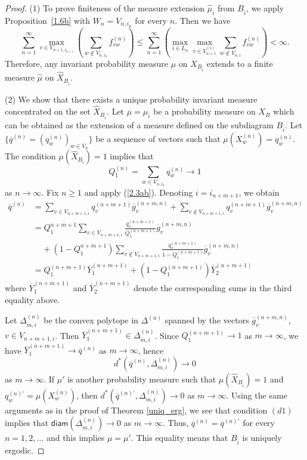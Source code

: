 \documentclass[11pt, english, reqno]{amsart}
\theoremstyle{definition}
\theoremstyle{remark}
\theoremstyle{plain}
\def\ov{\overline}
\def\wh{\widehat}
\numberwithin{equation}{section}
\begin{document}
{\begin{proof}
(1) To prove finiteness of the measure extension $\wh\mu_i$
from $B_{\ov i}$, we apply Proposition~\ref{1.6b} with $W_n = V_{n,i_n}$
 for every $n$. Then we  have
$$
\sum_{n=1}^{\infty} \max_{v \in V_{n+1, i_{n+1}}} \left( \sum_{w \notin
 V_{n,i_n}}f_{vw}^{(n)}\right) \leq \sum_{n = 1}^{\infty} \left(\max_{i \in
  L_{n}} \max_{v \in V_{n+1}^{(i)}}
 \sum_{w \notin V_{n,i}} f_{vw}^{(n)}\right) < \infty.
$$
Therefore, any invariant probability measure $\mu$ on $X_{B_{\ov i}}$
extends to a finite measure $\wh{\mu}$ on $\wh X_{B_{\ov i}}$.

\medskip
(2) We show that there exists a unique probability invariant measure
 concentrated on the set $\wh X_{B_{\ov i}}$. Let $\mu = \mu_{\ov i}$ be
 a  probability measure on $X_B$ which can be obtained as the extension of
 a  measure defined on the subdiagram $B_{\ov i}$. Let $\{\ov q^{(n)} =
 (q_w^{(n)})_{w \in V_n}\}$ be a sequence of vectors such that $
 \mu(X_w^{(n)}) = q_w^{(n)}$. The condition $\mu(\wh X_{B_{\ov i}}) =
 1$
 implies that
$$
Q_1^{(n)} = \sum_{w \in V_{n,i_n}}q_w^{(n)} \rightarrow 1
$$
as $n \rightarrow \infty$. Fix $n \geq 1$ and apply (\ref{2.3ab}). Denoting
$i = i_{n+m+1}$, we obtain
$$
\begin{aligned}
\ov q^{(n)} & = \sum_{v \in V_{n+m+1,i}} q_v^{(n+m+1)}
\ov g_v^{(n+m,n)} + \sum_{v \notin V_{n+m+1,i}} q_v^{(n+m+1)}\ov
g_v^{(n+m,n)} \\
& = Q_1^{n+m+1} \sum_{v \in V_{n+m+1,i}} \frac{q_v^{(n+m+1)}}
{Q_1^{(n+m+1)}} \ov g_v^{(n+m,n)}  \\
& \ \ \ \ \  + (1 - Q_1^{n+m+1}) \sum_{v \notin V_{n+m+1,i}}
\frac{q_v^{(n+m+1)}}{1 - Q_1^{(n+m+1)}} \ov g_v^{(n+m,n)}\\
& = Q_1^{(n+m+1)} \ov Y_1^{(n+m+1)} + (1 -Q_1^{(n+m+1)})
\ov Y_2^{(n+m+1)}
\end{aligned}
$$
where $\ov Y_1^{(n+m+1)}$ and $\ov Y_2^{(n+m+1)}$ denote the
corresponding sums in the third equality above.

Let $\Delta_{m,i}^{(n)}$ be the convex polytope in $\Delta^{(n)}$ spanned
 by the vectors $\ov g_v^{(n+m,n)}$, $v \in V_{n+m+1,i}$. Then
 $\ov Y_1^{(n+m+1)} \in \Delta_{m,i}^{(n)}$. Since $Q_1^{(n+m+1)}
 \rightarrow 1$ as $m \rightarrow \infty$, we have $\ov Y_1^{(n+m+1)}
 \rightarrow \ov q^{(n)}$ as $m \rightarrow \infty$, hence
$$
d^*(\ov q^{(n)}, \Delta_{m,i}^{(n)}) \rightarrow 0
$$
as $m \rightarrow \infty$.
If $\mu'$ is another probability measure such that $\mu(\wh X_{B_{\ov i}})
 = 1$ and $q_w^{(n)'} = \mu(X_w^{(n)})$, then $d^*(\ov q^{(n)'},
 \Delta^{(n)}_{m,i}) \rightarrow 0$ as $m \rightarrow \infty$. Using the
 same arguments as in the proof of Theorem \ref{uniq_erg}, we see that
  condition $(d1)$ implies that $\mathsf{diam}(\Delta_{m,i}^{(n)})
  \rightarrow 0$
 as $m \rightarrow \infty$. Thus, $\ov q^{(n)} = \ov {q}^{(n)'}$ for every
  $n  = 1,2,\ldots$ and this implies $\mu = \mu'$. This equality means that
   $B_{\ov i}$ is uniquely ergodic.


\end{proof}}
\end{document}

